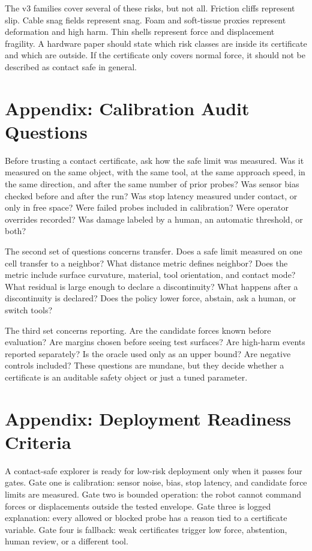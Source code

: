 \documentclass{article}
\begin{document}
The v3 families cover several of these risks, but not all. Friction cliffs
represent slip. Cable snag fields represent snag. Foam and soft-tissue proxies
represent deformation and high harm. Thin shells represent force and
displacement fragility. A hardware paper should state which risk classes are
inside its certificate and which are outside. If the certificate only covers
normal force, it should not be described as contact safe in general.

\section{Appendix: Calibration Audit Questions}

Before trusting a contact certificate, ask how the safe limit was measured. Was
it measured on the same object, with the same tool, at the same approach speed,
in the same direction, and after the same number of prior probes? Was sensor
bias checked before and after the run? Was stop latency measured under contact,
or only in free space? Were failed probes included in calibration? Were
operator overrides recorded? Was damage labeled by a human, an automatic
threshold, or both?

The second set of questions concerns transfer. Does a safe limit measured on
one cell transfer to a neighbor? What distance metric defines neighbor? Does
the metric include surface curvature, material, tool orientation, and contact
mode? What residual is large enough to declare a discontinuity? What happens
after a discontinuity is declared? Does the policy lower force, abstain, ask a
human, or switch tools?

The third set concerns reporting. Are the candidate forces known before
evaluation? Are margins chosen before seeing test surfaces? Are high-harm
events reported separately? Is the oracle used only as an upper bound? Are
negative controls included? These questions are mundane, but they decide
whether a certificate is an auditable safety object or just a tuned parameter.

\section{Appendix: Deployment Readiness Criteria}

A contact-safe explorer is ready for low-risk deployment only when it passes
four gates. Gate one is calibration: sensor noise, bias, stop latency, and
candidate force limits are measured. Gate two is bounded operation: the robot
cannot command forces or displacements outside the tested envelope. Gate three
is logged explanation: every allowed or blocked probe has a reason tied to a
certificate variable. Gate four is fallback: weak certificates trigger low
force, abstention, human review, or a different tool.
\end{document}
